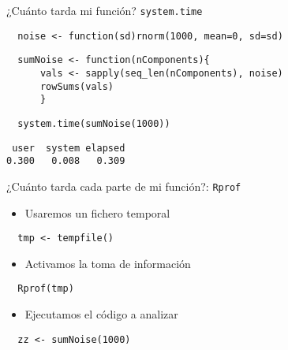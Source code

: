 \documentclass[xcolor={usenames,svgnames,dvipsnames}]{beamer}
\begin{document}
\begin{frame}[fragile,label={sec:orgheadline24}]{¿Cuánto tarda mi función? \texttt{system.time}}
 \lstset{language=R,label= ,caption= ,captionpos=b,numbers=none}
\begin{lstlisting}
  noise <- function(sd)rnorm(1000, mean=0, sd=sd)
\end{lstlisting}

\lstset{language=R,label= ,caption= ,captionpos=b,numbers=none}
\begin{lstlisting}
  sumNoise <- function(nComponents){
      vals <- sapply(seq_len(nComponents), noise)
      rowSums(vals)
      }
\end{lstlisting}

\lstset{language=R,label= ,caption= ,captionpos=b,numbers=none}
\begin{lstlisting}
  system.time(sumNoise(1000))
\end{lstlisting}

\begin{verbatim}
 user  system elapsed 
0.300   0.008   0.309
\end{verbatim}
\end{frame}

\begin{frame}[fragile,label={sec:orgheadline25}]{¿Cuánto tarda cada parte de mi función?: \texttt{Rprof}}
 \begin{itemize}
\item Usaremos un fichero temporal
\end{itemize}
\lstset{language=R,label= ,caption= ,captionpos=b,numbers=none}
\begin{lstlisting}
  tmp <- tempfile()
\end{lstlisting}

\begin{itemize}
\item Activamos la toma de información
\end{itemize}
\lstset{language=R,label= ,caption= ,captionpos=b,numbers=none}
\begin{lstlisting}
  Rprof(tmp)
\end{lstlisting}

\begin{itemize}
\item Ejecutamos el código a analizar
\end{itemize}
\lstset{language=R,label= ,caption= ,captionpos=b,numbers=none}
\begin{lstlisting}
  zz <- sumNoise(1000)
\end{lstlisting}
\end{frame}
\end{document}
